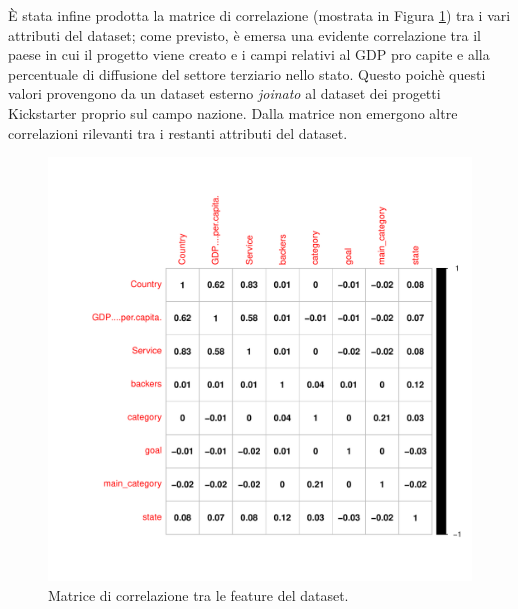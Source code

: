 È stata infine prodotta la matrice di correlazione (mostrata in Figura \ref{fig:corrplot}) tra i vari attributi del dataset; come previsto, è emersa una evidente correlazione tra il paese in cui il progetto viene creato e i campi relativi al GDP pro capite e alla percentuale di diffusione del settore terziario nello stato. Questo poichè questi valori provengono da un dataset esterno \textit{joinato} al dataset dei progetti Kickstarter proprio sul campo nazione. Dalla matrice non emergono altre correlazioni rilevanti tra i restanti attributi del dataset.

\begin{figure}
	\centering
	\includegraphics[width=1\linewidth]{../FinalResults/Images/Data_exploration_plots/corrplot}
	\caption{Matrice di correlazione tra le feature del dataset.}
	\label{fig:corrplot}
\end{figure}

